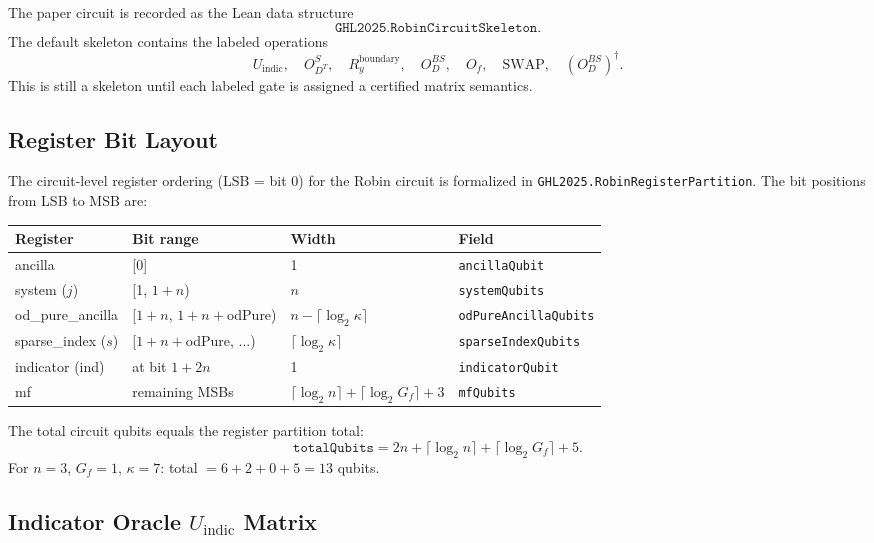 The paper circuit is recorded as the Lean data structure
\[
  \texttt{GHL2025.RobinCircuitSkeleton}.
\]
The default skeleton contains the labeled operations
\[
  U_{\mathrm{indic}},\quad O_{D^T}^{S},\quad R_y^{\mathrm{boundary}},
  \quad O_D^{BS},\quad O_f,\quad \mathrm{SWAP},\quad (O_D^{BS})^\dagger .
\]
This is still a skeleton until each labeled gate is assigned a certified matrix
semantics.

\subsection{Register Bit Layout}

The circuit-level register ordering (LSB = bit 0) for the Robin circuit
is formalized in \texttt{GHL2025.RobinRegisterPartition}.  The bit positions
from LSB to MSB are:

\begin{center}
\begin{tabular}{llll}
\hline
Register & Bit range & Width & Field \\
\hline
ancilla & [0] & 1 & \texttt{ancillaQubit} \\
system ($j$) & [1, $1{+}n$) & $n$ & \texttt{systemQubits} \\
od\_pure\_ancilla & [$1{+}n$, $1{+}n{+}$odPure) & $n - \lceil\log_2\kappa\rceil$ & \texttt{odPureAncillaQubits} \\
sparse\_index ($s$) & [$1{+}n{+}$odPure, ...) & $\lceil\log_2\kappa\rceil$ & \texttt{sparseIndexQubits} \\
indicator (ind) & at bit $1 + 2n$ & 1 & \texttt{indicatorQubit} \\
mf & remaining MSBs & $\lceil\log_2 n\rceil + \lceil\log_2 G_f\rceil + 3$ & \texttt{mfQubits} \\
\hline
\end{tabular}
\end{center}

The total circuit qubits equals the register partition total:
\[
  \texttt{totalQubits} = 2n + \lceil\log_2 n\rceil + \lceil\log_2 G_f\rceil + 5.
\]
For $n=3$, $G_f=1$, $\kappa=7$: total $= 6 + 2 + 0 + 5 = 13$ qubits.

\subsection{Indicator Oracle $U_{\mathrm{indic}}$ Matrix}

